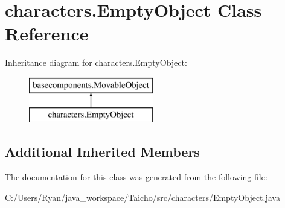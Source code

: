 \hypertarget{classcharacters_1_1_empty_object}{\section{characters.\-Empty\-Object Class Reference}
\label{classcharacters_1_1_empty_object}
}
Inheritance diagram for characters.\-Empty\-Object\-:\begin{figure}[H]
\begin{center}
\leavevmode
\includegraphics[height=2.000000cm]{classcharacters_1_1_empty_object}
\end{center}
\end{figure}
\subsection*{Additional Inherited Members}


The documentation for this class was generated from the following file\-:\begin{DoxyCompactItemize}
\item 
C\-:/\-Users/\-Ryan/java\-\_\-workspace/\-Taicho/src/characters/Empty\-Object.\-java\end{DoxyCompactItemize}
